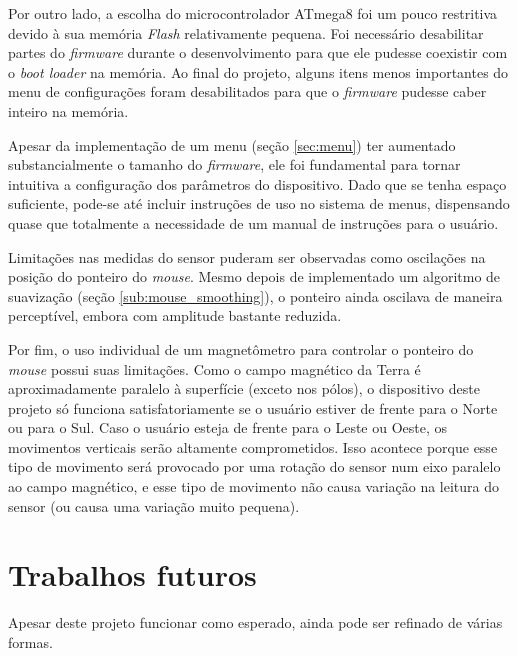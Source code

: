 \documentclass[brazil,pagestart=firstchapter]{abnt}
\begin{document}
Por outro lado, a escolha do microcontrolador ATmega8 foi um pouco
restritiva devido à sua memória \textit{Flash} relativamente pequena. Foi
necessário desabilitar partes do \textit{firmware} durante o
desenvolvimento para que ele pudesse coexistir com o \textit{boot loader} na
memória. Ao final do projeto, alguns itens menos importantes do menu de
configurações foram desabilitados para que o \textit{firmware} pudesse caber
inteiro na memória.

Apesar da implementação de um menu (seção \ref{sec:menu}) ter aumentado
substancialmente o tamanho do \textit{firmware}, ele foi fundamental para
tornar intuitiva a configuração dos parâmetros do dispositivo. Dado que se
tenha espaço suficiente, pode-se até incluir instruções de uso no sistema de
menus, dispensando quase que totalmente a necessidade de um manual de
instruções para o usuário.



Limitações nas medidas do sensor puderam ser observadas como oscilações na
posição do ponteiro do \textit{mouse}. Mesmo depois de implementado um
algoritmo de suavização (seção \ref{sub:mouse_smoothing}), o ponteiro ainda
oscilava de maneira perceptível, embora com amplitude bastante reduzida.

Por fim, o uso individual de um magnetômetro para controlar o ponteiro do
\textit{mouse} possui suas limitações. Como o campo magnético da Terra é
aproximadamente paralelo à superfície (exceto nos pólos), o dispositivo
deste projeto só funciona satisfatoriamente se o usuário estiver de frente
para o Norte ou para o Sul. Caso o usuário esteja de frente para o Leste ou
Oeste, os movimentos verticais serão altamente comprometidos. Isso acontece
porque esse tipo de movimento será provocado por uma rotação do sensor num
eixo paralelo ao campo magnético, e esse tipo de movimento não causa
variação na leitura do sensor (ou causa uma variação muito pequena).


\section{Trabalhos futuros}
\label{sec:trabalhos_futuros}

Apesar deste projeto funcionar como esperado, ainda pode ser refinado de
várias formas.
\end{document}

